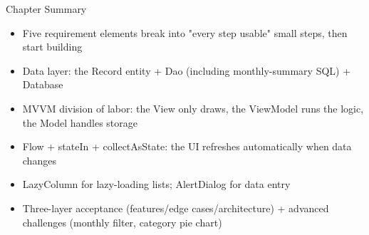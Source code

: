 \begin{tcbsummary}{Chapter Summary}
\begin{itemize}
  \item Five requirement elements break into "every step usable" small steps, then start building
  \item Data layer: the Record entity + Dao (including monthly-summary SQL) + Database
  \item MVVM division of labor: the View only draws, the ViewModel runs the logic, the Model handles storage
  \item Flow + stateIn + collectAsState: the UI refreshes automatically when data changes
  \item LazyColumn for lazy-loading lists; AlertDialog for data entry
  \item Three-layer acceptance (features/edge cases/architecture) + advanced challenges (monthly filter, category pie chart)
\end{itemize}

\end{tcbsummary}
